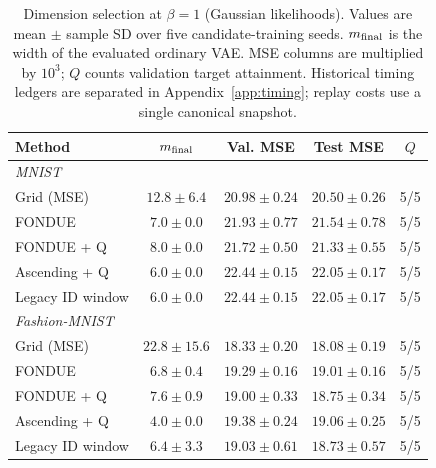 \documentclass[make,article,submit,pdftex,moreauthors]{Definitions/mdpi}
\begin{document}
\begin{table}[H]
\caption{Dimension selection at $\beta=1$ (Gaussian likelihoods). Values are mean $\pm$ sample SD over five candidate-training seeds. $m_{\rm final}$ is the width of the evaluated ordinary VAE. MSE columns are multiplied by $10^3$; $Q$ counts validation target attainment. Historical timing ledgers are separated in Appendix~\ref{app:timing}; replay costs use a single canonical snapshot.}\label{tab:main1}
\footnotesize
\setlength{\tabcolsep}{3.5pt}
\begin{tabular*}{\textwidth}{@{\extracolsep{\fill}}lcccc@{}}
\toprule
Method & $m_{\rm final}$ & Val. MSE & Test MSE & $Q$ \\
\midrule
\multicolumn{5}{l}{\emph{MNIST}} \\
Grid (MSE) & $12.8 \pm 6.4$ & $20.98 \pm 0.24$ & $20.50 \pm 0.26$ & 5/5 \\
FONDUE & $7.0 \pm 0.0$ & $21.93 \pm 0.77$ & $21.54 \pm 0.78$ & 5/5 \\
FONDUE + Q & $8.0 \pm 0.0$ & $21.72 \pm 0.50$ & $21.33 \pm 0.55$ & 5/5 \\
Ascending + Q & $6.0 \pm 0.0$ & $22.44 \pm 0.15$ & $22.05 \pm 0.17$ & 5/5 \\
Legacy ID window & $6.0 \pm 0.0$ & $22.44 \pm 0.15$ & $22.05 \pm 0.17$ & 5/5 \\
\midrule
\multicolumn{5}{l}{\emph{Fashion-MNIST}} \\
Grid (MSE) & $22.8 \pm 15.6$ & $18.33 \pm 0.20$ & $18.08 \pm 0.19$ & 5/5 \\
FONDUE & $6.8 \pm 0.4$ & $19.29 \pm 0.16$ & $19.01 \pm 0.16$ & 5/5 \\
FONDUE + Q & $7.6 \pm 0.9$ & $19.00 \pm 0.33$ & $18.75 \pm 0.34$ & 5/5 \\
Ascending + Q & $4.0 \pm 0.0$ & $19.38 \pm 0.24$ & $19.06 \pm 0.25$ & 5/5 \\
Legacy ID window & $6.4 \pm 3.3$ & $19.03 \pm 0.61$ & $18.73 \pm 0.57$ & 5/5 \\
\bottomrule
\end{tabular*}
\end{table}
\end{document}

